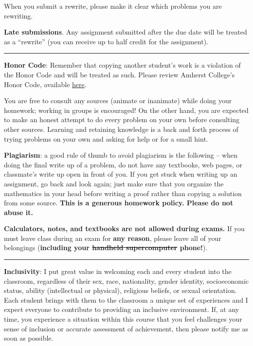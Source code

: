 \documentclass[12pt]{article}
\begin{document}
\medskip

\noindent When you submit a rewrite, please make it clear which problems you are rewriting.

\bigskip
\noindent\textbf{Late submissions}. Any assignment submitted after the due date will be treated as a ``rewrite'' (you can receive up to half credit for the assignment).

\smallskip \hrule \medskip

\noindent\textbf{Honor Code}: Remember that copying another student's work is a violation of the Honor Code and will be treated as such. Please review Amherst College's Honor Code, available \href{https://www.amherst.edu/offices/student-affairs/community-standards/college-standards/honor-code}{here}.

You are free to consult any sources (animate or inanimate) while doing your homework; working in groups is encouraged! %
On the other hand, you are expected to make an honest attempt to do every problem on your own before consulting other sources. Learning and retaining knowledge is a back and forth process of trying problems on your own and asking for help or for a small hint.

\bigskip
\noindent\textbf{Plagiarism}: a good rule of thumb to avoid plagiarism is the following -- when doing the final write up of a problem, do not have any textbooks, web pages, or classmate's write up open in front of you. If you get stuck when writing up an assignment, go back and look again; just make sure that you organize the mathematics in your head before writing a proof rather than copying a solution from some source. \textbf{This is a generous homework policy. Please do not abuse it.}

\bigskip
\noindent \textbf{Calculators, notes, and textbooks are not allowed during exams.}
 If you must leave class during an exam for \textbf{any reason}, please leave all of your belongings (\textbf{including your \sout{handheld supercomputer} phone!}).

\smallskip \hrule \medskip

\noindent\textbf{Inclusivity}: I put great value in welcoming each and every student into the classroom, regardless of their
sex, race, nationality, gender identity, socioeconomic status, ability (intellectual or physical), religious beliefs, or sexual orientation. Each student brings with them to the classroom a unique set of experiences and I expect everyone to contribute to providing an inclusive environment. If, at any time, you experience a situation within this course that you feel challenges your sense of inclusion or accurate assessment of achievement, then please notify me as soon as possible.
\end{document}
